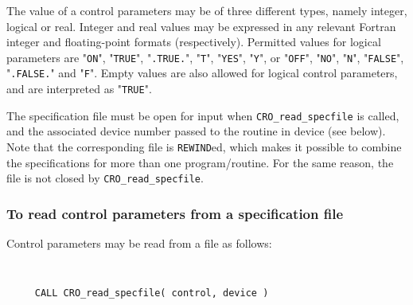 \documentclass{galahad}
\newcommand{\packagename}{CRO}
\begin{document}
The value of a control parameters may be of three different types, namely
integer, logical or real.
Integer and real values may be expressed in any relevant Fortran integer and
floating-point formats (respectively). Permitted values for logical
parameters are "{\tt ON}", "{\tt TRUE}", "{\tt .TRUE.}", "{\tt T}",
"{\tt YES}", "{\tt Y}", or "{\tt OFF}", "{\tt NO}",
"{\tt N}", "{\tt FALSE}", "{\tt .FALSE.}" and "{\tt F}".
Empty values are also allowed for
logical control parameters, and are interpreted as "{\tt TRUE}".

The specification file must be open for
input when {\tt \packagename\_read\_specfile}
is called, and the associated device number
passed to the routine in device (see below).
Note that the corresponding
file is {\tt REWIND}ed, which makes it possible to combine the specifications
for more than one program/routine.  For the same reason, the file is not
closed by {\tt \packagename\_read\_specfile}.

\subsubsection{To read control parameters from a specification file}
\label{readspec}

Control parameters may be read from a file as follows:
\hskip0.5in

\def\baselinestretch{0.8}
{\tt
\begin{verbatim}
     CALL CRO_read_specfile( control, device )
\end{verbatim}
}
\def\baselinestretch{1.0}
\end{document}
